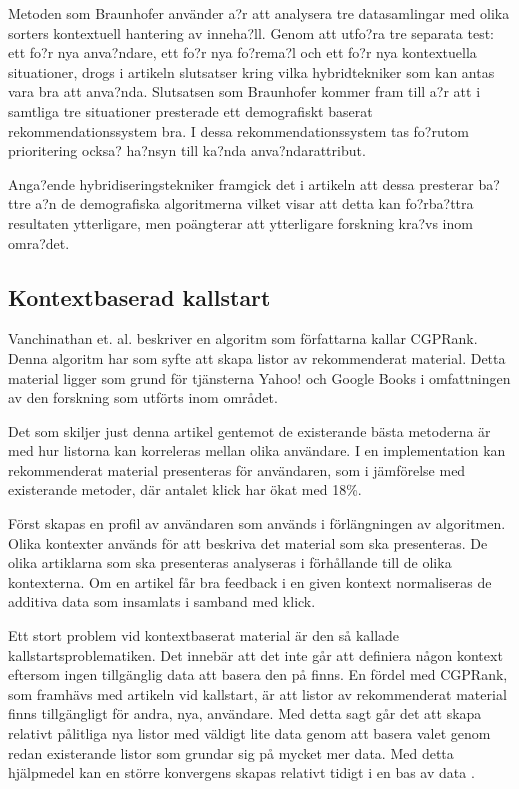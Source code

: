 \documentclass[a4paper,11pt]{article}
\begin{document}
{Metoden som Braunhofer använder a?r att analysera tre datasamlingar med olika sorters kontextuell hantering av inneha?ll. Genom att utfo?ra tre separata test: ett fo?r nya anva?ndare, ett fo?r nya fo?rema?l och ett fo?r nya kontextuella situationer, drogs i artikeln slutsatser kring vilka hybridtekniker som kan antas vara bra att anva?nda. Slutsatsen som Braunhofer kommer fram till a?r att i samtliga tre situationer presterade ett demografiskt baserat rekommendationssystem bra. I dessa rekommendationssystem tas fo?rutom prioritering ocksa? ha?nsyn till ka?nda anva?ndarattribut.

Anga?ende hybridiseringstekniker framgick det i artikeln att dessa presterar ba?ttre a?n de demografiska algoritmerna vilket visar att detta kan fo?rba?ttra resultaten ytterligare, men poängterar att ytterligare forskning kra?vs inom omra?det.

\subsection{Kontextbaserad kallstart}
Vanchinathan et. al. \cite{Vanchinathan} beskriver en algoritm som författarna kallar CGPRank. Denna algoritm har som syfte att skapa listor av rekommenderat material. Detta material ligger som grund för tjänsterna Yahoo! och Google Books i omfattningen av den forskning som utförts inom området.

Det som skiljer just denna artikel gentemot de existerande bästa metoderna är med hur listorna kan korreleras mellan olika användare. I en implementation kan rekommenderat material presenteras för användaren, som i jämförelse med existerande metoder, där antalet klick har ökat med 18\%.

Först skapas en profil av användaren som används i förlängningen av algoritmen. Olika kontexter används för att beskriva det material som ska presenteras. De olika artiklarna som ska presenteras analyseras i förhållande till de olika kontexterna. Om en artikel får bra feedback i en given kontext normaliseras de additiva data som insamlats i samband med klick. 

Ett stort problem vid kontextbaserat material är den så kallade kallstartsproblematiken. Det innebär att det inte går att definiera någon kontext eftersom ingen tillgänglig data att basera den på finns. En fördel med CGPRank, som framhävs med artikeln vid kallstart, är att listor av rekommenderat material finns tillgängligt för andra, nya, användare. Med detta sagt går det att skapa relativt pålitliga nya listor med väldigt lite data genom att basera valet genom redan existerande listor som grundar sig på mycket mer data. Med detta hjälpmedel kan en större konvergens skapas relativt tidigt i en bas av data \cite{Vanchinathan}.

}
\end{document}
